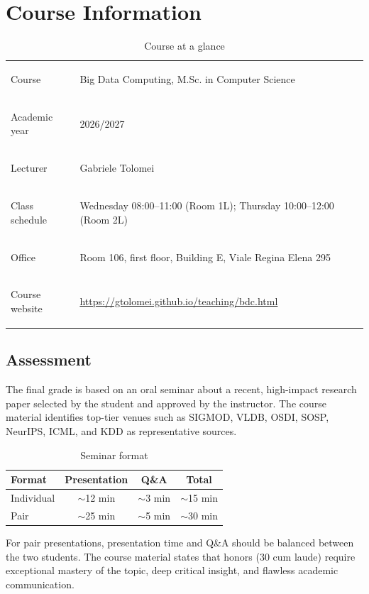 \documentclass[11pt,a4paper,oneside]{book}
\begin{document}
\frontmatter
\hypersetup{pageanchor=true}
\tableofcontents

\chapter*{Course Information}

\begin{table}[htbp]
\centering
\caption*{Course at a glance}
\begin{tabularx}{\textwidth}{>{\bfseries\raggedright\arraybackslash}p{3.5cm} Y}
\toprule
Course & Big Data Computing, M.Sc. in Computer Science \\
Academic year & 2026/2027 \\
Lecturer & Gabriele Tolomei \\
Class schedule & Wednesday 08:00--11:00 (Room 1L); Thursday 10:00--12:00 (Room 2L) \\
Office & Room 106, first floor, Building E, Viale Regina Elena 295 \\
Course website & \url{https://gtolomei.github.io/teaching/bdc.html} \\
\bottomrule
\end{tabularx}
\end{table}

\section*{Assessment}
The final grade is based on an oral seminar about a recent, high-impact research paper selected by the student and approved by the instructor. The course material identifies top-tier venues such as SIGMOD, VLDB, OSDI, SOSP, NeurIPS, ICML, and KDD as representative sources.

\begin{table}[htbp]
\centering
\caption*{Seminar format}
\begin{tabular}{lccc}
\toprule
\rowcolor{TableTint}
Format & Presentation & Q\&A & Total \\
\midrule
Individual & $\sim$12 min & $\sim$3 min & $\sim$15 min \\
Pair & $\sim$25 min & $\sim$5 min & $\sim$30 min \\
\bottomrule
\end{tabular}
\end{table}

For pair presentations, presentation time and Q\&A should be balanced between the two students. The course material states that honors (30 cum laude) require exceptional mastery of the topic, deep critical insight, and flawless academic communication.
\end{document}
